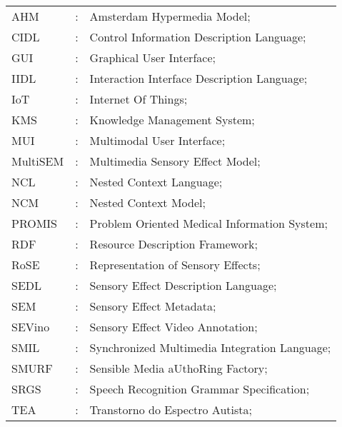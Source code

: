 \cleardoublepage
{}
\begin{tabular}{lcl}
AHM & : & Amsterdam Hypermedia Model;\\
CIDL & : & Control Information Description Language;\\
GUI & : & Graphical User Interface;\\
IIDL & : & Interaction Interface Description Language;\\
IoT & : & Internet Of Things;\\
KMS & : & Knowledge Management System;\\
MUI & : & Multimodal User Interface;\\
MultiSEM & : & Multimedia Sensory Effect Model;\\
NCL & : & Nested Context Language;\\
NCM & : & Nested Context Model;\\
PROMIS & : & Problem Oriented Medical Information System;\\
RDF & : & Resource Description Framework;\\
RoSE & : & Representation of Sensory Effects;\\
SEDL & : & Sensory Effect Description Language;\\
SEM & : & Sensory Effect Metadata;\\
SEVino & : & Sensory Effect Video Annotation;\\
SMIL & : & Synchronized Multimedia Integration Language;\\
SMURF & : & Sensible Media aUthoRing Factory;\\
SRGS & : & Speech Recognition Grammar Specification;\\
TEA & : & Transtorno do Espectro Autista;\\


\end{tabular}
\pagestyle{ruledheader}
\tableofcontents


